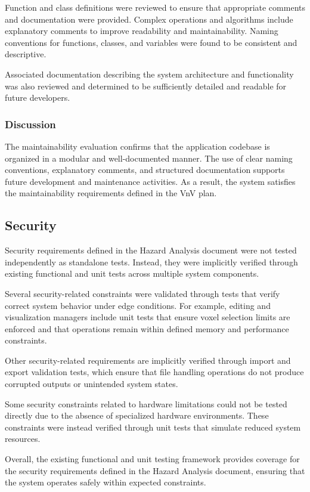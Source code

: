 \documentclass[12pt, titlepage]{article}
\begin{document}
Function and class definitions were reviewed to ensure that appropriate comments and documentation were provided. Complex operations and algorithms include explanatory comments to improve readability and maintainability. Naming conventions for functions, classes, and variables were found to be consistent and descriptive.

Associated documentation describing the system architecture and functionality was also reviewed and determined to be sufficiently detailed and readable for future developers.

\subsubsection{Discussion}

The maintainability evaluation confirms that the application codebase is organized in a modular and well-documented manner. The use of clear naming conventions, explanatory comments, and structured documentation supports future development and maintenance activities. As a result, the system satisfies the maintainability requirements defined in the VnV plan.

\subsection{Security}

Security requirements defined in the Hazard Analysis document were not tested independently as standalone tests. Instead, they were implicitly verified through existing functional and unit tests across multiple system components.

Several security-related constraints were validated through tests that verify correct system behavior under edge conditions. For example, editing and visualization managers include unit tests that ensure voxel selection limits are enforced and that operations remain within defined memory and performance constraints.

Other security-related requirements are implicitly verified through import and export validation tests, which ensure that file handling operations do not produce corrupted outputs or unintended system states.

Some security constraints related to hardware limitations could not be tested directly due to the absence of specialized hardware environments. These constraints were instead verified through unit tests that simulate reduced system resources.

Overall, the existing functional and unit testing framework provides coverage for the security requirements defined in the Hazard Analysis document, ensuring that the system operates safely within expected constraints.
\end{document}
